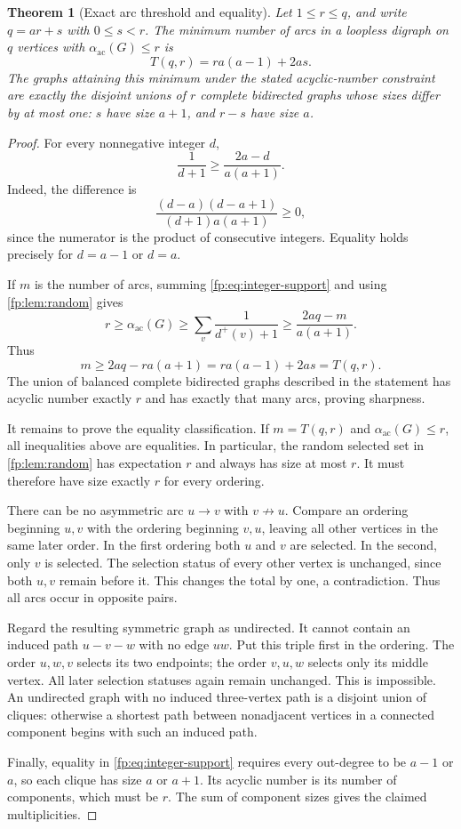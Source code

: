 \documentclass[11pt,letterpaper]{article}
\numberwithin{equation}{section}
\newtheorem{theorem}{Theorem}[section]
\theoremstyle{definition}
\theoremstyle{remark}
\theoremstyle{definition}
\newcommand{\ac}{\alpha_{\mathrm{ac}}}
\begin{document}
\begin{theorem}[Exact arc threshold and equality]\label{fp:thm:turan}
Let \(1\leq r\leq q\), and write \(q=ar+s\) with \(0\leq s<r\).
The minimum number of arcs in a loopless digraph on \(q\) vertices with
\(\ac(G)\leq r\) is
\[
 T(q,r)=ra(a-1)+2as.
\]
The graphs attaining this minimum under the stated acyclic-number
constraint are exactly the disjoint unions of \(r\) complete bidirected
graphs whose sizes differ by at most one: \(s\) have size \(a+1\), and
\(r-s\) have size \(a\).
\end{theorem}
\begin{proof}
For every nonnegative integer \(d\),
\begin{equation}\label{fp:eq:integer-support}
 \frac1{d+1}\geq\frac{2a-d}{a(a+1)}.
\end{equation}
Indeed, the difference is
\[
 \frac{(d-a)(d-a+1)}{(d+1)a(a+1)}\geq0,
\]
since the numerator is the product of consecutive integers. Equality
holds precisely for \(d=a-1\) or \(d=a\).

If \(m\) is the number of arcs, summing \cref{fp:eq:integer-support} and
using \cref{fp:lem:random} gives
\[
 r\geq\ac(G)\geq\sum_v\frac1{d^+(v)+1}
 \geq\frac{2aq-m}{a(a+1)}.
\]
Thus
\[
 m\geq2aq-ra(a+1)=ra(a-1)+2as=T(q,r).
\]
The union of balanced complete bidirected graphs described in the
statement has acyclic number exactly \(r\) and has exactly that many
arcs, proving sharpness.

It remains to prove the equality classification. If \(m=T(q,r)\) and
\(\ac(G)\leq r\), all inequalities above are equalities. In particular,
the random selected set in \cref{fp:lem:random} has expectation \(r\) and
always has size at most \(r\). It must therefore have size exactly
\(r\) for every ordering.

There can be no asymmetric arc \(u\to v\) with \(v\not\to u\).
Compare an ordering beginning \(u,v\) with the ordering beginning
\(v,u\), leaving all other vertices in the same later order. In the
first ordering both \(u\) and \(v\) are selected. In the second,
only \(v\) is selected. The selection status of every other vertex is
unchanged, since both \(u,v\) remain before it. This changes the total
by one, a contradiction. Thus all arcs occur in opposite pairs.

Regard the resulting symmetric graph as undirected. It cannot contain an
induced path \(u-v-w\) with no edge \(uw\). Put this triple first in
the ordering. The order \(u,w,v\) selects its two endpoints; the order
\(v,u,w\) selects only its middle vertex. All later selection statuses
again remain unchanged. This is impossible. An undirected graph with no
induced three-vertex path is a disjoint union of cliques: otherwise a
shortest path between nonadjacent vertices in a connected component begins
with such an induced path.

Finally, equality in \cref{fp:eq:integer-support} requires every out-degree
to be \(a-1\) or \(a\), so each clique has size \(a\) or \(a+1\).
Its acyclic number is its number of components, which must be \(r\).
The sum of component sizes gives the claimed multiplicities.
\end{proof}
\end{document}
